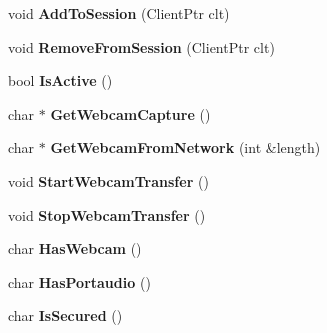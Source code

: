 \begin{DoxyCompactItemize}
\item 
void {\bfseries Add\+To\+Session} (Client\+Ptr clt)\hypertarget{classNetworkCommunication_af68cae5d7ff6d87a5e7d8d951605362b}{}\label{classNetworkCommunication_af68cae5d7ff6d87a5e7d8d951605362b}

\item 
void {\bfseries Remove\+From\+Session} (Client\+Ptr clt)\hypertarget{classNetworkCommunication_ac3417adea8ed41f904d0292db611a4e7}{}\label{classNetworkCommunication_ac3417adea8ed41f904d0292db611a4e7}

\item 
bool {\bfseries Is\+Active} ()\hypertarget{classNetworkCommunication_a19287204acfa5463fb4e83ea391fa667}{}\label{classNetworkCommunication_a19287204acfa5463fb4e83ea391fa667}

\item 
char $\ast$ {\bfseries Get\+Webcam\+Capture} ()\hypertarget{classNetworkCommunication_ae710462caffcb83db5706457de05bcf7}{}\label{classNetworkCommunication_ae710462caffcb83db5706457de05bcf7}

\item 
char $\ast$ {\bfseries Get\+Webcam\+From\+Network} (int \&length)\hypertarget{classNetworkCommunication_a042060c2793eeb950c29c2641266a345}{}\label{classNetworkCommunication_a042060c2793eeb950c29c2641266a345}

\item 
void {\bfseries Start\+Webcam\+Transfer} ()\hypertarget{classNetworkCommunication_a02769397c3d2255059e9a6945aaba974}{}\label{classNetworkCommunication_a02769397c3d2255059e9a6945aaba974}

\item 
void {\bfseries Stop\+Webcam\+Transfer} ()\hypertarget{classNetworkCommunication_a52fcb9a2791718c23e4c79bf3679ec6f}{}\label{classNetworkCommunication_a52fcb9a2791718c23e4c79bf3679ec6f}

\item 
char {\bfseries Has\+Webcam} ()\hypertarget{classNetworkCommunication_ad1c80f9912dfe63c76f86bd1a5274928}{}\label{classNetworkCommunication_ad1c80f9912dfe63c76f86bd1a5274928}

\item 
char {\bfseries Has\+Portaudio} ()\hypertarget{classNetworkCommunication_a022560b72da42f4007a7a1cbcd556641}{}\label{classNetworkCommunication_a022560b72da42f4007a7a1cbcd556641}

\item 
char {\bfseries Is\+Secured} ()\hypertarget{classNetworkCommunication_a288bcbc9d6381b4e05361d6d98e3d34f}{}\label{classNetworkCommunication_a288bcbc9d6381b4e05361d6d98e3d34f}


\end{DoxyCompactItemize}

